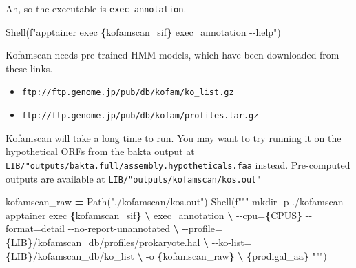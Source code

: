 \documentclass[
]{book}
\newenvironment{Shaded}{\begin{snugshade}}{\end{snugshade}}
\newcommand{\NormalTok}[1]{#1}
\newcommand{\OperatorTok}[1]{\textcolor[rgb]{0.81,0.36,0.00}{\textbf{#1}}}
\newcommand{\SpecialCharTok}[1]{\textcolor[rgb]{0.81,0.36,0.00}{\textbf{#1}}}
\newcommand{\SpecialStringTok}[1]{\textcolor[rgb]{0.31,0.60,0.02}{#1}}
\newcommand{\StringTok}[1]{\textcolor[rgb]{0.31,0.60,0.02}{#1}}
\providecommand{\tightlist}{%
  \setlength{\itemsep}{0pt}\setlength{\parskip}{0pt}}
\begin{document}
Ah, so the executable is \texttt{exec\_annotation}.

\begin{Shaded}
\begin{Highlighting}[numbers=left,,]
\NormalTok{Shell(}\SpecialStringTok{f"apptainer exec }\SpecialCharTok{\{}\NormalTok{kofamscan\_sif}\SpecialCharTok{\}}\SpecialStringTok{ exec\_annotation {-}{-}help"}\NormalTok{)}
\end{Highlighting}
\end{Shaded}

Kofamscan needs pre-trained HMM models, which have been downloaded from these links.

\begin{itemize}
\tightlist
\item
  \texttt{ftp://ftp.genome.jp/pub/db/kofam/ko\_list.gz}
\item
  \texttt{ftp://ftp.genome.jp/pub/db/kofam/profiles.tar.gz}
\end{itemize}

Kofamscan will take a long time to run. You may want to try running it on the hypothetical ORFs from the bakta output at
\texttt{LIB/"outputs/bakta.full/assembly.hypotheticals.faa} instead. Pre-computed outputs are available at \texttt{LIB/"outputs/kofamscan/kos.out"}

\begin{Shaded}
\begin{Highlighting}[numbers=left,,]
\NormalTok{kofamscan\_raw }\OperatorTok{=}\NormalTok{ Path(}\StringTok{"./kofamscan/kos.out"}\NormalTok{)}
\NormalTok{Shell(}\SpecialStringTok{f"""}
\SpecialStringTok{mkdir {-}p ./kofamscan}
\SpecialStringTok{apptainer exec }\SpecialCharTok{\{}\NormalTok{kofamscan\_sif}\SpecialCharTok{\}}\SpecialStringTok{ }\OperatorTok{\textbackslash{}}
\SpecialStringTok{    exec\_annotation }\OperatorTok{\textbackslash{}}
\SpecialStringTok{        {-}{-}cpu=}\SpecialCharTok{\{}\NormalTok{CPUS}\SpecialCharTok{\}}\SpecialStringTok{ {-}{-}format=detail {-}{-}no{-}report{-}unannotated }\OperatorTok{\textbackslash{}}
\SpecialStringTok{        {-}{-}profile=}\SpecialCharTok{\{}\NormalTok{LIB}\SpecialCharTok{\}}\SpecialStringTok{/kofamscan\_db/profiles/prokaryote.hal }\OperatorTok{\textbackslash{}}
\SpecialStringTok{        {-}{-}ko{-}list=}\SpecialCharTok{\{}\NormalTok{LIB}\SpecialCharTok{\}}\SpecialStringTok{/kofamscan\_db/ko\_list }\OperatorTok{\textbackslash{}}
\SpecialStringTok{        {-}o }\SpecialCharTok{\{}\NormalTok{kofamscan\_raw}\SpecialCharTok{\}}\SpecialStringTok{ }\OperatorTok{\textbackslash{}}
\SpecialStringTok{        }\SpecialCharTok{\{}\NormalTok{prodigal\_aa}\SpecialCharTok{\}}
\SpecialStringTok{"""}\NormalTok{)}
\end{Highlighting}
\end{Shaded}
\end{document}

